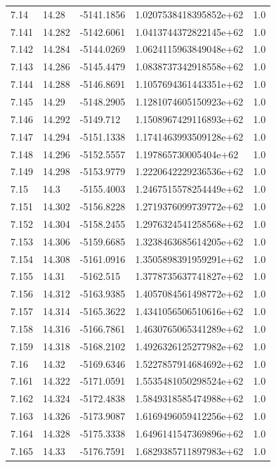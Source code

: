 \begin{tabular}{lllll}
7.14 & 14.28 & -5141.1856 & 1.0207538418395852e+62 & 1.0 \\
7.141 & 14.282 & -5142.6061 & 1.0413744372822145e+62 & 1.0 \\
7.142 & 14.284 & -5144.0269 & 1.0624115963849048e+62 & 1.0 \\
7.143 & 14.286 & -5145.4479 & 1.0838737342918558e+62 & 1.0 \\
7.144 & 14.288 & -5146.8691 & 1.1057694361443351e+62 & 1.0 \\
7.145 & 14.29 & -5148.2905 & 1.1281074605150923e+62 & 1.0 \\
7.146 & 14.292 & -5149.712 & 1.1508967429116893e+62 & 1.0 \\
7.147 & 14.294 & -5151.1338 & 1.1741463993509128e+62 & 1.0 \\
7.148 & 14.296 & -5152.5557 & 1.197865730005404e+62 & 1.0 \\
7.149 & 14.298 & -5153.9779 & 1.2220642229236536e+62 & 1.0 \\
7.15 & 14.3 & -5155.4003 & 1.2467515578254449e+62 & 1.0 \\
7.151 & 14.302 & -5156.8228 & 1.2719376099739772e+62 & 1.0 \\
7.152 & 14.304 & -5158.2455 & 1.2976324541258568e+62 & 1.0 \\
7.153 & 14.306 & -5159.6685 & 1.3238463685614205e+62 & 1.0 \\
7.154 & 14.308 & -5161.0916 & 1.3505898391959291e+62 & 1.0 \\
7.155 & 14.31 & -5162.515 & 1.3778735637741827e+62 & 1.0 \\
7.156 & 14.312 & -5163.9385 & 1.4057084561498772e+62 & 1.0 \\
7.157 & 14.314 & -5165.3622 & 1.4341056506510616e+62 & 1.0 \\
7.158 & 14.316 & -5166.7861 & 1.4630765065341289e+62 & 1.0 \\
7.159 & 14.318 & -5168.2102 & 1.4926326125277982e+62 & 1.0 \\
7.16 & 14.32 & -5169.6346 & 1.5227857914684692e+62 & 1.0 \\
7.161 & 14.322 & -5171.0591 & 1.5535481050298524e+62 & 1.0 \\
7.162 & 14.324 & -5172.4838 & 1.5849318585474988e+62 & 1.0 \\
7.163 & 14.326 & -5173.9087 & 1.6169496059412256e+62 & 1.0 \\
7.164 & 14.328 & -5175.3338 & 1.6496141547369896e+62 & 1.0 \\
7.165 & 14.33 & -5176.7591 & 1.6829385711897983e+62 & 1.0 \\

\end{tabular}
